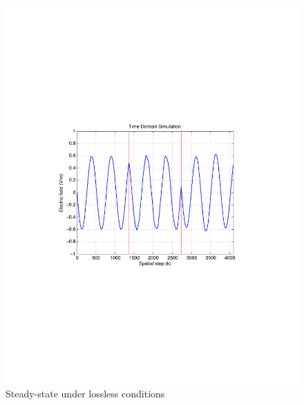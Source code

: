 \begin{figure}[H]
\centering
\includegraphics[scale=0.78, trim=3.5cm 8.7cm 4.5cm 8.75cm, clip]{Figures/FigCh03_1DDNGSteadyStateLossless.pdf}
\caption{Steady-state under lossless conditions}
\label{1DDNG-SteadyState-Lossless}
\end{figure}
